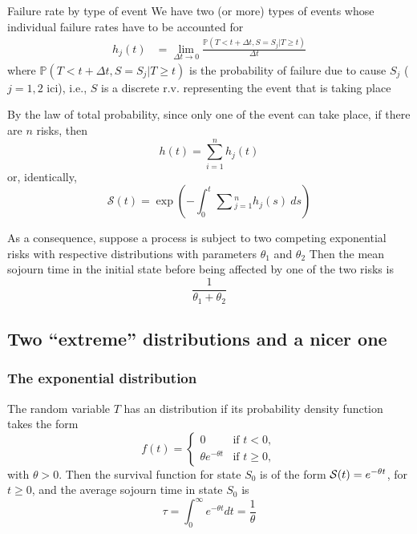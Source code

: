 \documentclass[aspectratio=169]{beamer}\usepackage[]{graphicx}\usepackage[]{xcolor}
\begin{document}
\begin{frame}{Failure rate by type of event}
We have two (or more) types of events whose individual failure rates have to be accounted for
\begin{align*}
h_j(t) &= \lim_{\Delta t\to 0} \frac{\mathbb{P}( T<t+\Delta t, S=S_j | T\geq t)}{\Delta t} 
\end{align*}
where $\mathbb{P}(T<t+\Delta t, S=S_j | T\geq t)$ is the probability of failure due to cause $S_j$ ($j=1,2$ ici), i.e., $S$ is a discrete r.v. representing the event that is taking place
\end{frame}

\begin{frame}
By the law of total probability, since only one of the event can take place, if there are $n$ risks, then
$$
h(t) = \sum_{i=1}^n h_j(t)
$$
or, identically,
$$
\mathcal{S}(t)
=
\exp\left(
  -\int_0^t \sum\textstyle_{j=1}^n h_j(s)\ ds
\right)
$$
\end{frame}

\begin{frame}
As a consequence, suppose a process is subject to two competing exponential risks with respective distributions with parameters $\theta_1$ and $\theta_2$
\vfill
Then the mean sojourn time in the initial state before being affected by one of the two risks is
$$
\frac{1}{\theta_1+\theta_2}
$$
\end{frame}


\subsection{Two ``extreme'' distributions and a nicer one}

\begin{frame}\frametitle{The exponential distribution}
The random variable $T$ has an  distribution if its
probability density function takes the form
\begin{equation}\label{eq:exp_distrib}
f(t)=\begin{cases}0&\textrm{if }t<0,\\
\theta e^{-\theta t}&\textrm{if }t\geq 0,
\end{cases}
\end{equation}
with $\theta>0$. Then the
survival function for state $S_0$ is of the form $\S(t)=e^{-\theta
  t}$, for $t\geq 0$, and the average sojourn time in state $S_0$ is
\[
\tau=\int_0^\infty e^{-\theta t}dt=\frac 1\theta
\]
\end{frame}
\end{document}
